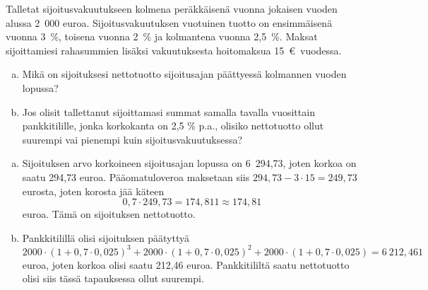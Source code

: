 \documentclass{article}\usepackage[]{graphicx}\usepackage[]{color}
\begin{document}
\begin{question} 
    Talletat sijoitusvakuutukseen kolmena peräkkäisenä vuonna jokaisen vuoden alussa 2~000 euroa. Sijoitusvakuutuksen vuotuinen tuotto on ensimmäisenä vuonna 3~\%, toisena vuonna 2~\% ja kolmantena vuonna 2{,}5~\%. Maksat sijoittamiesi rahasummien lisäksi vakuutuksesta hoitomaksua 15~\euro\ vuodessa. 
    \begin{enumerate}[(a)]
        \item Mikä on sijoituksesi nettotuotto sijoitusajan päättyessä kolmannen vuoden lopussa? 
        \item Jos olisit tallettanut sijoittamasi summat samalla tavalla vuosittain pankkitilille, jonka korkokanta on 2{,}5 \% p.a., olisiko nettotuotto ollut suurempi vai pienempi kuin sijoitusvakuutuksessa?
    \end{enumerate}
\end{question}
\begin{solution}

    \begin{enumerate}[(a)]
        \item Sijoituksen arvo korkoineen sijoitusajan lopussa on 6~294{,}73, joten korkoa on saatu 294{,}73 euroa. Pääomatuloveroa maksetaan siis \(294{,}73 - 3\cdot15 = 249{,}73\) eurosta, joten korosta jää käteen 
        \[
           0,7\cdot249{,}73 = 174{,}811 \approx 174{,}81
        \]
        euroa. Tämä on sijoituksen nettotuotto.
        \item Pankkitilillä olisi sijoituksen päätyttyä
        \[
            2000\cdot(1+0,7\cdot0,025)^3 + 2000\cdot(1+0,7\cdot0,025)^2+ 2000\cdot(1+0,7\cdot0,025) = 6~212{,}461
        \]
        euroa, joten korkoa olisi saatu 212{,}46 euroa. Pankkitililtä saatu nettotuotto olisi siis tässä tapauksessa ollut suurempi.
    \end{enumerate}
\end{solution}
\end{document}
